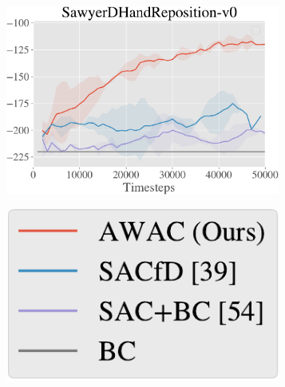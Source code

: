 \begin{figure}[t]
\begin{subfigure}[b]{0.28\textwidth}
        \includegraphics[width=0.99\textwidth]{awac/figures/robot/hand_curve-crop.pdf}
    \end{subfigure}
    \begin{subfigure}[b]{0.1\textwidth}
        \center
        \hspace{0.02\linewidth}
        \includegraphics[width=0.99\textwidth]{awac/figures/robot/robot_legend4-crop.pdf}
        \vspace{0.6cm}
    \end{subfigure}


\end{figure}
